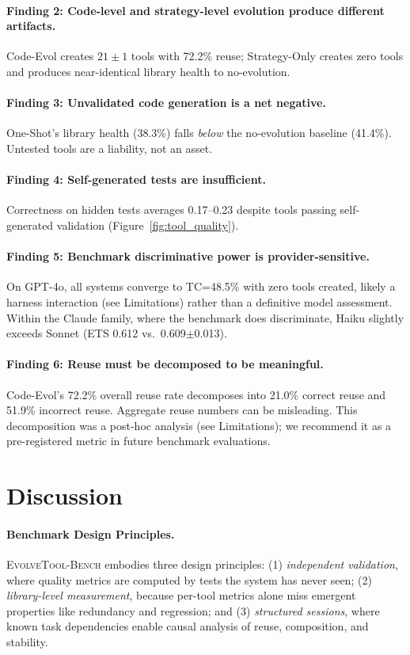 \documentclass[sigplan,review,anonymous]{acmart}
\begin{document}
\paragraph{Finding 2: Code-level and strategy-level evolution produce different artifacts.} Code-Evol creates $21 \pm 1$ tools with 72.2\% reuse; Strategy-Only creates zero tools and produces near-identical library health to no-evolution.

\paragraph{Finding 3: Unvalidated code generation is a net negative.} One-Shot's library health (38.3\%) falls \emph{below} the no-evolution baseline (41.4\%). Untested tools are a liability, not an asset.

\paragraph{Finding 4: Self-generated tests are insufficient.} Correctness on hidden tests averages 0.17--0.23 despite tools passing self-generated validation (Figure~\ref{fig:tool_quality}).

\paragraph{Finding 5: Benchmark discriminative power is provider-sensitive.} On GPT-4o, all systems converge to TC=48.5\% with zero tools created, likely a harness interaction (see Limitations) rather than a definitive model assessment. Within the Claude family, where the benchmark does discriminate, Haiku slightly exceeds Sonnet (ETS 0.612 vs.\ 0.609$\pm$0.013).

\paragraph{Finding 6: Reuse must be decomposed to be meaningful.} Code-Evol's 72.2\% overall reuse rate decomposes into 21.0\% correct reuse and 51.9\% incorrect reuse. Aggregate reuse numbers can be misleading. This decomposition was a post-hoc analysis (see Limitations); we recommend it as a pre-registered metric in future benchmark evaluations.

\section{Discussion}

\paragraph{Benchmark Design Principles.} \textsc{EvolveTool-Bench} embodies three design principles: (1) \emph{independent validation}, where quality metrics are computed by tests the system has never seen; (2) \emph{library-level measurement}, because per-tool metrics alone miss emergent properties like redundancy and regression; and (3) \emph{structured sessions}, where known task dependencies enable causal analysis of reuse, composition, and stability.
\end{document}
